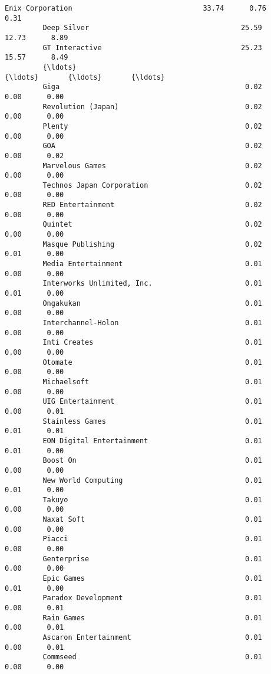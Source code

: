 \documentclass[11pt]{article}
\begin{document}
\begin{Verbatim}[commandchars=\\\{\}]
         Enix Corporation                               33.74      0.76      0.31   
         Deep Silver                                    25.59     12.73      8.89   
         GT Interactive                                 25.23     15.57      8.49   
         {\ldots}                                              {\ldots}       {\ldots}       {\ldots}   
         Giga                                            0.02      0.00      0.00   
         Revolution (Japan)                              0.02      0.00      0.00   
         Plenty                                          0.02      0.00      0.00   
         GOA                                             0.02      0.00      0.02   
         Marvelous Games                                 0.02      0.00      0.00   
         Technos Japan Corporation                       0.02      0.00      0.00   
         RED Entertainment                               0.02      0.00      0.00   
         Quintet                                         0.02      0.00      0.00   
         Masque Publishing                               0.02      0.01      0.00   
         Media Entertainment                             0.01      0.00      0.00   
         Interworks Unlimited, Inc.                      0.01      0.01      0.00   
         Ongakukan                                       0.01      0.00      0.00   
         Interchannel-Holon                              0.01      0.00      0.00   
         Inti Creates                                    0.01      0.00      0.00   
         Otomate                                         0.01      0.00      0.00   
         Michaelsoft                                     0.01      0.00      0.00   
         UIG Entertainment                               0.01      0.00      0.01   
         Stainless Games                                 0.01      0.01      0.01   
         EON Digital Entertainment                       0.01      0.01      0.00   
         Boost On                                        0.01      0.00      0.00   
         New World Computing                             0.01      0.01      0.00   
         Takuyo                                          0.01      0.00      0.00   
         Naxat Soft                                      0.01      0.00      0.00   
         Piacci                                          0.01      0.00      0.00   
         Genterprise                                     0.01      0.00      0.00   
         Epic Games                                      0.01      0.01      0.00   
         Paradox Development                             0.01      0.00      0.01   
         Rain Games                                      0.01      0.00      0.01   
         Ascaron Entertainment                           0.01      0.00      0.01   
         Commseed                                        0.01      0.00      0.00   
         

\end{Verbatim}
\end{document}
